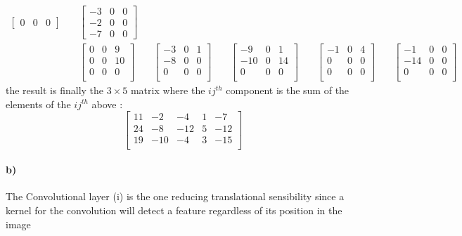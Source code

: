 \documentclass{article}
\begin{document}
\[\begin{aligned}
\begin{bmatrix}
				 0 & 0 & 0
			\end{bmatrix}
			\quad
			&\begin{bmatrix}
				-3 & 0 & 0\\
				-2 & 0 & 0\\
				-7 & 0 & 0
			\end{bmatrix}
		\\
			&\begin{bmatrix}
				0 & 0 & 9 \\
				0 & 0 & 10 \\
				0 & 0 & 0 \\
			\end{bmatrix}
			\quad
			&\begin{bmatrix}
				-3 & 0 & 1 \\
				-8 & 0 & 0 \\
				 0 & 0 & 0 \\
			\end{bmatrix}
			\quad
			&\begin{bmatrix}
				 -9 & 0 & 1 \\
				-10 & 0 & 14 \\
				  0 & 0 & 0 \\
			\end{bmatrix}
			\quad
			&\begin{bmatrix}
				-1 & 0 & 4 \\
				 0 & 0 & 0 \\
				 0 & 0 & 0 \\
			\end{bmatrix}
			\quad
			&\begin{bmatrix}
				 -1 & 0 & 0 \\
				-14 & 0 & 0 \\
				  0 & 0 & 0 \\
			\end{bmatrix}
		\end{aligned}
		\]
		the result is finally the $3 \times 5$ matrix where the $ij^{th}$ component is the sum of the elements of the $ij^{th}$ above :
		\[
		\begin{bmatrix}
			11 & -2 & -4 & 1 & -7 \\
			24 & -8 & -12 & 5 & -12 \\
			19 & -10 & -4 & 3 & -15 \\
		\end{bmatrix}
		\]
		
	
		\paragraph{b)} 
		The Convolutional  layer (i) is the one reducing translational sensibility since a kernel for the convolution will detect a feature regardless of its position in the image
		
\end{document}
